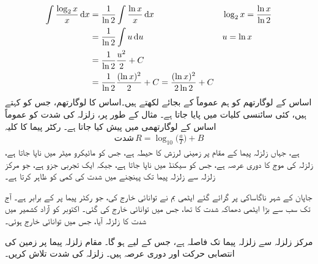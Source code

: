\begin{align*}
\int\frac{\log_2x}{x}\dif x&=\frac{1}{\ln 2}\int\frac{\ln x}{x}\dif x&&\log_2x=\frac{\ln x}{\ln 2}\\
&=\frac{1}{\ln 2}\int u\dif u&&u=\ln x\\
&=\frac{1}{\ln 2}\frac{u^2}{2}+C\\
&=\frac{1}{\ln 2}\frac{(\ln x)^2}{2}+C=\frac{(\ln x)^2}{2\ln 2}+C
\end{align*}
اساس   کے لوگارتھم کو ہم عموماً  کے بجائے  لکھتے ہیں۔اساس  کا  لوگارتھم،  جس کو  کہتے ہیں،  کئی سائنسی کلیات میں پایا جاتا ہے۔ مثال کے طور پر،  زلزلہ کی شدت کو عموماً اساس  کے  لوگارتھمی  میں پیش کیا  جاتا ہے۔ رکٹر پیما کا کلیہ 
\begin{align*}
\text{شدت}\, R=\log_{10}\big(\frac{a}{T}\big)+B
\end{align*}
ہے، جہاں زلزلہ پیما کے مقام پر زمینی لرزش کا حیطہ  ہے،  جس کو مائیکرو میٹر میں ناپا جاتا ہے، زلزلہ کی موج کا دوری عرصہ  ہے،  جس کو سیکنڈ میں ناپا جاتا ہے،  جبکہ  ایک تجربی جزو ہے،  جو مرکز زلزلہ سے زلزلہ پیما تک پہنچنے میں شدت کی کمی کو ظاہر کرتا ہے۔ 

جاپان کے شہر ناگاساکی پر گرائے  گئے ایٹمی بم نے   توانائی خارج کی،  جو رکٹر پیما پر  کے برابر ہے۔  آج تک سب سے بڑا ایٹمی دھماکہ  شدت کا تھا،  جس میں  توانائی خارج کی گئی۔  اکتوبر    کو آزاد کشمیر میں  شدت کا زلزلہ آیا، جس میں  توانائی خارج ہوئی۔

مرکز زلزلہ سے زلزلہ پیما تک فاصلہ  ہے،  جس کے لیے  ہو گا۔ مقام زلزلہ پیما پر زمین کی انتصابی حرکت  اور دوری عرصہ  ہیں۔ زلزلہ کی شدت تلاش کریں۔

